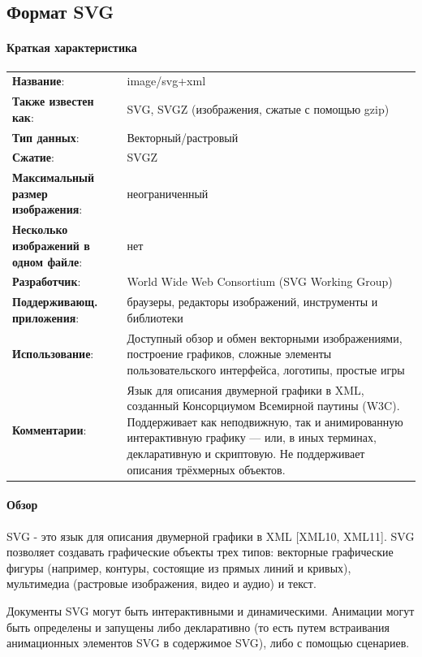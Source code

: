 \subsection{Формат SVG} \label{subs:svg}
\paragraph{Краткая характеристика}

\begin{longtable}{p{110pt} p{340pt}}
	\label{tab:svg}
	\centering
	\textbf{Название}:&image/svg+xml\\
	\textbf{Также известен как}:&SVG, SVGZ (изображения, сжатые с помощью gzip)\\
	\textbf{Тип данных}:&Векторный/растровый\\
	\textbf{Сжатие}:&SVGZ\\
	\textbf{Максимальный размер изображения}:&неограниченный\\
	\textbf{Несколько изображений в одном файле}:&нет\\
	\textbf{Разработчик}:&World Wide Web Consortium (SVG Working Group)\\
	\textbf{Поддерживающ. приложения}:&браузеры, редакторы изображений, инструменты и библиотеки\\
	\textbf{Использование}:&Доступный обзор и обмен векторными изображениями, построение графиков, сложные элементы пользовательского интерфейса, логотипы, простые игры\\
	\textbf{Комментарии}:&Язык для описания двумерной графики в XML, созданный Консорциумом Всемирной паутины (W3C). Поддерживает как неподвижную, так и анимированную интерактивную графику — или, в иных терминах, декларативную и скриптовую. Не поддерживает описания трёхмерных объектов.\\
\end{longtable}

\paragraph{Обзор}

SVG - это язык для описания двумерной графики в XML [XML10, XML11]. SVG позволяет создавать графические объекты трех типов: векторные графические фигуры (например, контуры, состоящие из прямых линий и кривых), мультимедиа (растровые изображения, видео и аудио) и текст.

Документы SVG могут быть интерактивными и динамическими. Анимации могут быть определены и запущены либо декларативно (то есть путем встраивания анимационных элементов SVG в содержимое SVG), либо с помощью сценариев.

